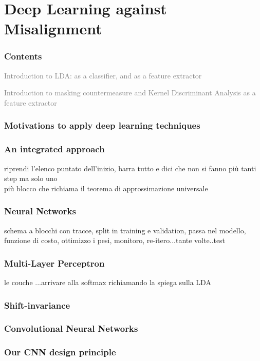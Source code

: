 \section{Deep Learning against Misalignment}
\begin{frame}
\frametitle{Contents}
\begin{itemize}
\item \textcolor{grey}{Introduction to LDA: as a classifier, and as a feature extractor
\item Introduction to masking countermeasure and Kernel Discriminant Analysis as a feature extractor}
\item {}
\end{itemize}
\end{frame}
\begin{frame}
\frametitle{Motivations to apply deep learning techniques}

\end{frame}

\begin{frame}
\frametitle{An integrated approach}
riprendi l'elenco puntato dell'inizio, barra tutto e dici che non si fanno più tanti step ma solo uno\\

più blocco che richiama il teorema di approssimazione universale
\end{frame}

\begin{frame}
\frametitle{Neural Networks}
schema a blocchi con tracce, split in training e validation, passa nel modello, funzione di costo, ottimizzo i pesi, monitoro, re-itero...tante volte..test
\end{frame}

\begin{frame}
\frametitle{Multi-Layer Perceptron}
le couche ...arrivare alla softmax richiamando la spiega sulla LDA

\end{frame}

\begin{frame}

\frametitle{Shift-invariance}
\end{frame}

\begin{frame}
\frametitle{Convolutional Neural Networks}
\end{frame}


\begin{frame}
\frametitle{Our CNN design principle}

\end{frame}


